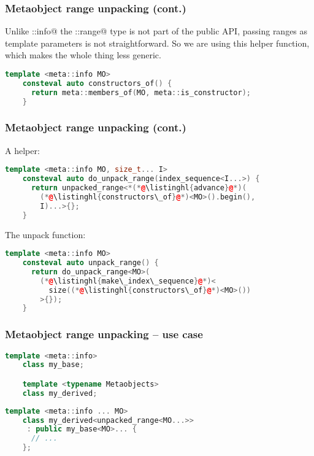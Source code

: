 \documentclass[compress,table,xcolor=table]{beamer}
\begin{document}
\begin{frame}[fragile]
    \frametitle{Metaobject range unpacking (cont.)}
  \Large
  Unlike \verb@meta::info@ the \verb@detail::range@ type is not part of the
    public API, passing ranges as template parameters is not straightforward.
  \vfill
  So we are using this helper function, which makes the whole thing less generic.
    \begin{lstlisting}[language=c++]
    template <meta::info MO>
    consteval auto constructors_of() {
      return meta::members_of(MO, meta::is_constructor);
    }
    \end{lstlisting}
\end{frame}
\begin{frame}[fragile]
\frametitle{Metaobject range unpacking (cont.)}
    \large
    A helper:
    \begin{lstlisting}[language=c++]
    template <meta::info MO, size_t... I>
    consteval auto do_unpack_range(index_sequence<I...>) {
      return unpacked_range<*(*@\listinghl{advance}@*)(
        (*@\listinghl{constructors\_of}@*)<MO>().begin(),
        I)...>{};
    }
    \end{lstlisting}
    \vfill
    The unpack function:
    \begin{lstlisting}[language=c++]
    template <meta::info MO>
    consteval auto unpack_range() {
      return do_unpack_range<MO>(
		(*@\listinghl{make\_index\_sequence}@*)<
          size((*@\listinghl{constructors\_of}@*)<MO>())
        >{});
    }
    \end{lstlisting}
\end{frame}
\begin{frame}[fragile]
\frametitle{Metaobject range unpacking -- use case}
    \begin{lstlisting}[language=c++]
    template <meta::info>
    class my_base;

    template <typename Metaobjects>
    class my_derived;
    \end{lstlisting}

    \begin{lstlisting}[language=c++]
    template <meta::info ... MO>
    class my_derived<unpacked_range<MO...>>
     : public my_base<MO>... {
      // ...
    };
    \end{lstlisting}
\end{frame}
\end{document}
